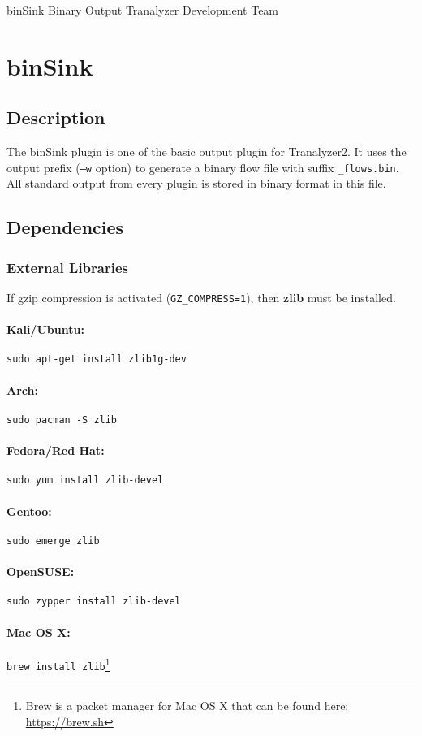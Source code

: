 \documentclass[documentation]{subfiles}
\begin{document}
\trantitle
    {binSink}
    {Binary Output}
    {Tranalyzer Development Team}

\section{binSink}\label{s:binSink}

\subsection{Description}
The binSink plugin is one of the basic output plugin for Tranalyzer2. It uses the output prefix ({\tt --w} option) to generate a binary flow file with suffix {\tt \_flows.bin}. All standard output from every plugin is stored in binary format in this file.

\subsection{Dependencies}

\subsubsection{External Libraries}
If gzip compression is activated ({\tt GZ\_COMPRESS=1}), then {\bf zlib} must be installed.

\paragraph{Kali/Ubuntu:} {\tt sudo apt-get install zlib1g-dev}
\paragraph{Arch:} {\tt sudo pacman -S zlib}
\paragraph{Fedora/Red Hat:} {\tt sudo yum install zlib-devel}
\paragraph{Gentoo:} {\tt sudo emerge zlib}
\paragraph{OpenSUSE:} {\tt sudo zypper install zlib-devel}
\paragraph{Mac OS X:} {\tt brew install zlib}\footnote{Brew is a packet manager for Mac OS X that can be found here: \url{https://brew.sh}}
\end{document}
